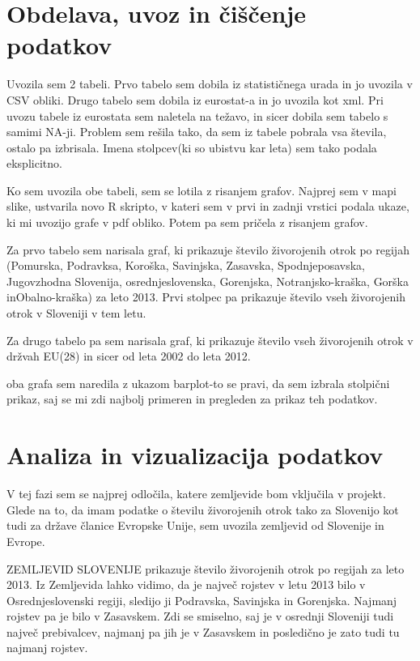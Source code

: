 \documentclass[11pt,a4paper]{article}
\begin{document}
\begin{itemize}
 
\newpage
\section{Obdelava, uvoz in čiščenje podatkov}

Uvozila sem 2 tabeli. Prvo tabelo sem dobila iz statističnega urada in jo uvozila v CSV obliki. Drugo tabelo sem dobila iz eurostat-a in jo uvozila kot xml.
Pri uvozu tabele iz eurostata sem naletela na težavo, in sicer dobila sem tabelo s samimi NA-ji. Problem sem rešila tako, da sem iz tabele pobrala vsa števila, ostalo pa izbrisala. Imena stolpcev(ki so ubistvu kar leta) sem tako podala eksplicitno.

Ko sem uvozila obe tabeli, sem se lotila z risanjem grafov. Najprej sem v mapi slike, ustvarila novo R skripto, v kateri sem v prvi in zadnji vrstici podala ukaze, ki mi uvozijo grafe v pdf obliko. Potem pa sem pričela z risanjem grafov.

Za prvo tabelo sem narisala graf, ki prikazuje število živorojenih otrok po regijah (Pomurska, Podravksa, Koroška, Savinjska, Zasavska, Spodnjeposavska, Jugovzhodna Slovenija, osrednjeslovenska, Gorenjska, Notranjsko-kraška, Gorška inObalno-kraška) za leto 2013. Prvi stolpec pa prikazuje število vseh živorojenih otrok v Sloveniji  v tem letu.

Za drugo tabelo pa sem narisala graf, ki prikazuje število vseh živorojenih otrok v držvah EU(28) in sicer od leta 2002 do leta 2012.

oba grafa sem naredila z ukazom barplot-to se pravi, da sem izbrala stolpični prikaz, saj se mi zdi najbolj primeren in pregleden za prikaz teh podatkov.



\newpage
\section{Analiza in vizualizacija podatkov}



V tej fazi sem se najprej odločila, katere zemljevide bom vključila v projekt. Glede na to, da imam podatke o številu živorojenih otrok tako za Slovenijo kot tudi za države članice Evropske Unije, sem uvozila zemljevid od Slovenije in Evrope.

ZEMLJEVID SLOVENIJE prikazuje število živorojenih otrok po regijah za leto 2013. Iz Zemljevida lahko vidimo, da je največ rojstev v letu 2013 bilo v Osrednjeslovenski regiji, sledijo ji Podravska, Savinjska in Gorenjska. Najmanj rojstev pa je bilo v Zasavskem. Zdi se smiselno, saj je v osrednji Sloveniji tudi največ prebivalcev, najmanj pa jih je v Zasavskem in posledično je zato tudi tu najmanj rojstev.


\end{itemize}
\end{document}
